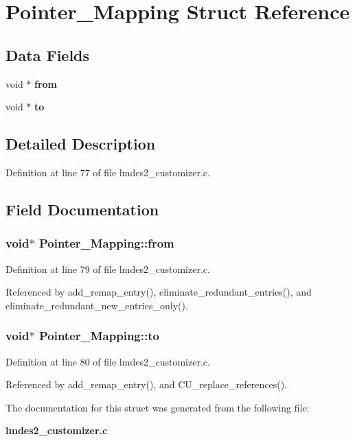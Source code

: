 \section{Pointer\_\-Mapping Struct Reference}
\label{structPointer__Mapping}
\subsection*{Data Fields}
\begin{CompactItemize}
\item 
void $\ast$ \bf{from}
\item 
void $\ast$ \bf{to}
\end{CompactItemize}


\subsection{Detailed Description}




Definition at line 77 of file lmdes2\_\-customizer.c.

\subsection{Field Documentation}
\subsubsection{\setlength{\rightskip}{0pt plus 5cm}void$\ast$ \bf{Pointer\_\-Mapping::from}}\label{structPointer__Mapping_661c5e8b6062b1e7d04fdcfd8f2df2c4}




Definition at line 79 of file lmdes2\_\-customizer.c.

Referenced by add\_\-remap\_\-entry(), eliminate\_\-redundant\_\-entries(), and eliminate\_\-redundant\_\-new\_\-entries\_\-only().
\subsubsection{\setlength{\rightskip}{0pt plus 5cm}void$\ast$ \bf{Pointer\_\-Mapping::to}}\label{structPointer__Mapping_78ef5abc3b5cb05326bb41277ec887e3}




Definition at line 80 of file lmdes2\_\-customizer.c.

Referenced by add\_\-remap\_\-entry(), and CU\_\-replace\_\-references().

The documentation for this struct was generated from the following file:\begin{CompactItemize}
\item 
\bf{lmdes2\_\-customizer.c}\end{CompactItemize}
